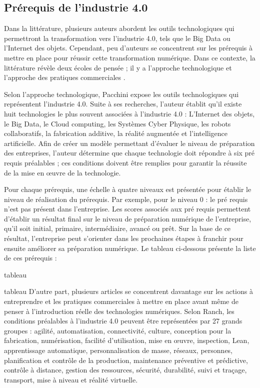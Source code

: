 \newpage
\subsection{Prérequis de l'industrie 4.0}
Dans la littérature, plusieurs auteurs abordent les outils technologiques qui permettront la transformation vers l'industrie 4.0, tels que le Big Data ou l'Internet des objets. Cependant, peu d'auteurs se concentrent sur les prérequis à mettre en place pour réussir cette transformation numérique. Dans ce contexte, la littérature révèle deux écoles de pensée ; il y a l'approche technologique et l'approche des pratiques commerciales \cite{genestPrerequisitesImplementationIndustry2020}. 

Selon l'approche technologique, Pacchini expose les outils technologiques qui représentent l'industrie 4.0. Suite à ses recherches, l'auteur établit qu'il existe huit technologies le plus souvent associées à l'industrie 4.0 : L'Internet des objets, le Big Data, le Cloud computing, les Systèmes Cyber Physique, les robots collaboratifs, la fabrication additive, la réalité augmentée et l'intelligence artificielle. Afin de créer un modèle permettant d'évaluer le niveau de préparation des entreprises, l'auteur détermine que chaque technologie doit répondre à six pré requis préalables ; ces conditions doivent être remplies pour garantir la réussite de la mise en œuvre de la technologie. 

Pour chaque prérequis, une échelle à quatre niveaux est présentée pour établir le niveau de réalisation du prérequis. Par exemple, pour le niveau 0 : le pré requis n'est pas présent dans l'entreprise. Les scores associés aux pré requis permettent d'établir un résultat final sur le niveau de préparation numérique de l'entreprise, qu'il soit initial, primaire, intermédiaire, avancé ou prêt. Sur la base de ce résultat, l'entreprise peut s'orienter dans les prochaines étapes à franchir pour ensuite améliorer sa préparation numérique. Le tableau ci-dessous présente la liste de ces prérequis :

\newpage
tableau 

\newpage
tableau 
\newpage
D'autre part, plusieurs articles se concentrent davantage sur les actions à entreprendre et les pratiques commerciales à mettre en place avant même de penser à l'introduction réelle des technologies numériques. Selon Ranch, les conditions préalables à l'industrie 4.0 peuvent être représentées par 27 grands groupes : agilité, automatisation, connectivité, culture, conception pour la fabrication, numérisation, facilité d'utilisation, mise en œuvre, inspection, Lean, apprentissage automatique, personnalisation de masse, réseaux, personnes, planification et contrôle de la production, maintenance préventive et prédictive, contrôle à distance, gestion des ressources, sécurité, durabilité, suivi et traçage, transport, mise à niveau et réalité virtuelle. 

